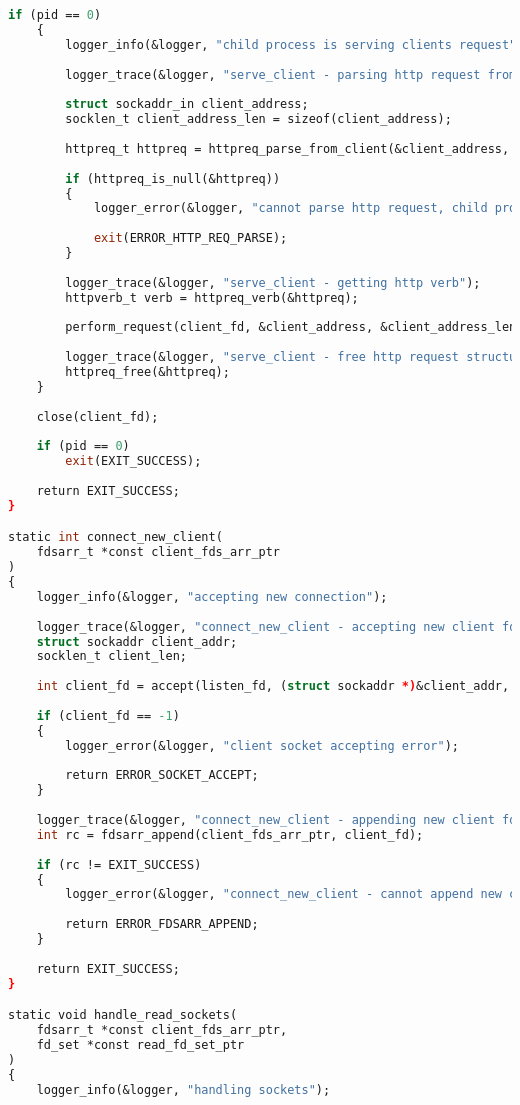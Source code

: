 \begin{lstlisting}[label=server_code,caption=Реализация статического веб-сервера,language=Caml]
	if (pid == 0)
	{
		logger_info(&logger, "child process is serving clients request");
		
		logger_trace(&logger, "serve_client - parsing http request from client");
		
		struct sockaddr_in client_address;
		socklen_t client_address_len = sizeof(client_address);
		
		httpreq_t httpreq = httpreq_parse_from_client(&client_address, &client_address_len, client_fd);
		
		if (httpreq_is_null(&httpreq))
		{
			logger_error(&logger, "cannot parse http request, child process is beeing killed");
			
			exit(ERROR_HTTP_REQ_PARSE);
		}
		
		logger_trace(&logger, "serve_client - getting http verb");
		httpverb_t verb = httpreq_verb(&httpreq);
		
		perform_request(client_fd, &client_address, &client_address_len, &httpreq);
		
		logger_trace(&logger, "serve_client - free http request structure memory");
		httpreq_free(&httpreq);
	}
	
	close(client_fd);
	
	if (pid == 0)
		exit(EXIT_SUCCESS);
	
	return EXIT_SUCCESS;
}

static int connect_new_client(
	fdsarr_t *const client_fds_arr_ptr
)
{
	logger_info(&logger, "accepting new connection");
	
	logger_trace(&logger, "connect_new_client - accepting new client fd with accept");
	struct sockaddr client_addr; 
	socklen_t client_len;
	
	int client_fd = accept(listen_fd, (struct sockaddr *)&client_addr, &client_len);
	
	if (client_fd == -1)
	{
		logger_error(&logger, "client socket accepting error");
		
		return ERROR_SOCKET_ACCEPT;
	}
	
	logger_trace(&logger, "connect_new_client - appending new client fd to clients fds array");
	int rc = fdsarr_append(client_fds_arr_ptr, client_fd);
	
	if (rc != EXIT_SUCCESS)
	{
		logger_error(&logger, "connect_new_client - cannot append new client fd to clients fds array");
		
		return ERROR_FDSARR_APPEND;
	}
	
	return EXIT_SUCCESS;
}

static void handle_read_sockets(
	fdsarr_t *const client_fds_arr_ptr,
	fd_set *const read_fd_set_ptr
)
{
	logger_info(&logger, "handling sockets");
	

\end{lstlisting}
